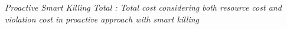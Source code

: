\textit{Proactive Smart Killing Total : Total cost considering both resource cost and violation cost in proactive approach with smart killing}